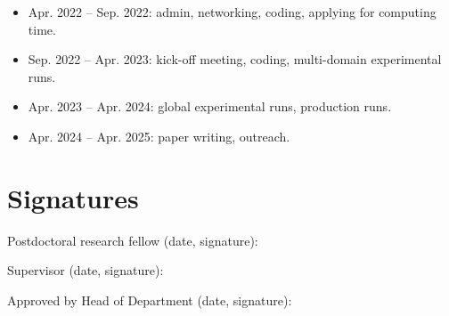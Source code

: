 \documentclass{article}
\begin{document}
    \begin{itemize}
      \item Apr. 2022 -- Sep. 2022: admin, networking, coding, applying for
        computing time.
      \item Sep. 2022 -- Apr. 2023: kick-off meeting, coding, multi-domain
        experimental runs.
      \item Apr. 2023 -- Apr. 2024: global experimental runs, production runs.
      \item Apr. 2024 -- Apr. 2025: paper writing, outreach.
    \end{itemize}

\section{Signatures}

    Postdoctoral research fellow (date, signature):

    Supervisor (date, signature):

    Approved by Head of Department (date, signature):


\end{document}
